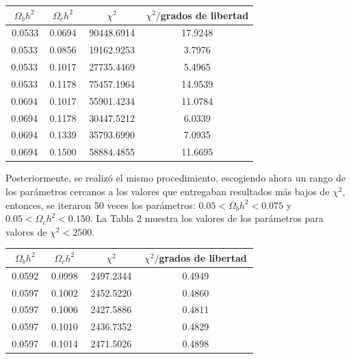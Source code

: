 \documentclass[twocolumn,letterpaper,spanish]{revtex4}
\numberwithin{equation}{section}
\begin{document}
\begin{center}
\begin{tabular}{| c | c | c | c |}\hline
$\Omega_b h^2$ & $\Omega_c h^2$ & $\chi^2$ & $\chi^2/$grados de libertad    \\ \hline
	\,0.0533  & \,0.0694\,  &  \,90448.6914\,  &  17.9248 \\
	0.0533  & 0.0856  &  19162.9253  &  3.7976 \\
	0.0533  & 0.1017  &  27735.4469  &  5.4965 \\
	0.0533  & 0.1178  &  75457.1964  & 14.9539 \\
	0.0694  & 0.1017  &  55901.4234  & 11.0784 \\
	0.0694  & 0.1178  &  30447.5212  &  6.0339 \\
	0.0694  & 0.1339  &  35793.6990  &  7.0935 \\
	0.0694  & 0.1500  &  58884.4855  & 11.6695 \\ \hline
\end{tabular}\label{tabla1}
\end{center}

Posteriormente, se realiz\'o el mismo procedimiento, escogiendo ahora un rango de los par\'ametros cercanos a los valores que entregaban resultados m\'as bajos de $\chi^2$, entonces, se iteraron 50 veces los par\'ametros: $0.05<\Omega_b h^2< 0.075$ y $0.05<\Omega_c h^2<0.150$. La Tabla 2 muestra los valores de los par\'ametros para valores de $\chi^2<2500$.

\begin{center}
\begin{tabular}{| c | c | c | c |}\hline
$\Omega_b h^2$ & $\Omega_c h^2$ & $\chi^2$ & \,$\chi^2/$grados de libertad\,       \\ \hline
	\,0.0592\,   & \,0.0998\, & \,2497.2344\,   & 0.4949  \\
	0.0597   & 0.1002 & 2452.5220  & 0.4860  \\
	0.0597   & 0.1006 & 2427.5886  & 0.4811  \\
	0.0597   & 0.1010 & 2436.7352  & 0.4829  \\
	0.0597   & 0.1014 & 2471.5026  & 0.4898   \\\hline
\end{tabular}\label{tabla3}
\end{center}
\end{document}
